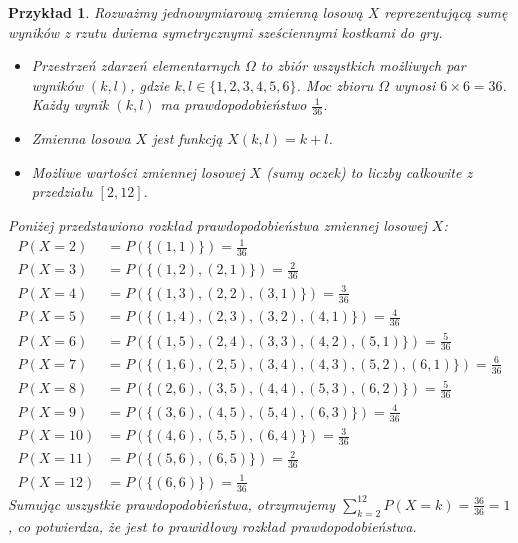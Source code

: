 \documentclass{article}
\newtheorem{Prz}{Przykład}
\begin{document}
\begin{Prz}
Rozważmy jednowymiarową zmienną losową $X$ reprezentującą sumę wyników z rzutu dwiema symetrycznymi sześciennymi kostkami do gry.
\begin{itemize}
    \item Przestrzeń zdarzeń elementarnych $\Omega$ to zbiór wszystkich możliwych par wyników $(k, l)$, gdzie $k,l \in \{1, 2, 3, 4, 5, 6\}$.
    Moc zbioru $\Omega$ wynosi $6 \times 6 = 36$. Każdy wynik $(k,l)$ ma prawdopodobieństwo $\frac{1}{36}$.
    \item Zmienna losowa $X$ jest funkcją $X(k,l) = k+l$.
    \item Możliwe wartości zmiennej losowej $X$ (sumy oczek) to liczby całkowite z przedziału $[2, 12]$.
\end{itemize}

Poniżej przedstawiono rozkład prawdopodobieństwa zmiennej losowej $X$:
\begin{align*}
P(X=2)   &= P(\{(1,1)\}) = \frac{1}{36} \\
P(X=3)   &= P(\{(1,2), (2,1)\}) = \frac{2}{36} \\
P(X=4)   &= P(\{(1,3), (2,2), (3,1)\}) = \frac{3}{36} \\
P(X=5)   &= P(\{(1,4), (2,3), (3,2), (4,1)\}) = \frac{4}{36} \\
P(X=6)   &= P(\{(1,5), (2,4), (3,3), (4,2), (5,1)\}) = \frac{5}{36} \\
P(X=7)   &= P(\{(1,6), (2,5), (3,4), (4,3), (5,2), (6,1)\}) = \frac{6}{36} \\
P(X=8)   &= P(\{(2,6), (3,5), (4,4), (5,3), (6,2)\}) = \frac{5}{36} \\
P(X=9)   &= P(\{(3,6), (4,5), (5,4), (6,3)\}) = \frac{4}{36} \\
P(X=10)  &= P(\{(4,6), (5,5), (6,4)\}) = \frac{3}{36} \\
P(X=11)  &= P(\{(5,6), (6,5)\}) = \frac{2}{36} \\
P(X=12)  &= P(\{(6,6)\}) = \frac{1}{36}
\end{align*}
Sumując wszystkie prawdopodobieństwa, otrzymujemy $\sum_{k=2}^{12} P(X=k) = \frac{36}{36} = 1$, co potwierdza, że jest to prawidłowy rozkład prawdopodobieństwa.
\end{Prz}
\end{document}
